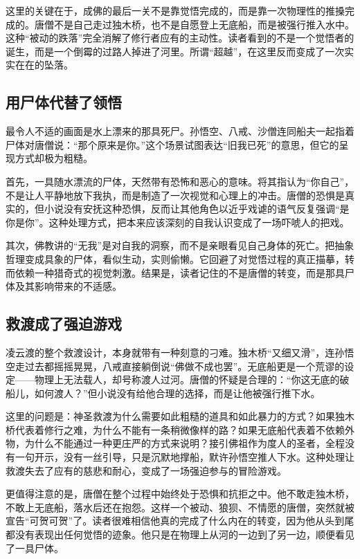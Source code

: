 \documentclass{ctexart}
\begin{document}
这里的关键在于，成佛的最后一关不是靠觉悟完成的，而是靠一次物理性的推搡完成的。唐僧不是自己走过独木桥，也不是自愿登上无底船，而是被强行推入水中。这种“被动的跌落”完全消解了修行者应有的主动性。读者看到的不是一个觉悟者的诞生，而是一个倒霉的过路人掉进了河里。所谓“超越”，在这里反而变成了一次实实在在的坠落。

\subsection{用尸体代替了领悟}

最令人不适的画面是水上漂来的那具死尸。孙悟空、八戒、沙僧连同船夫一起指着尸体对唐僧说：“那个原来是你。”这个场景试图表达“旧我已死”的意思，但它的呈现方式却极为粗糙。

首先，一具随水漂流的尸体，天然带有恐怖和恶心的意味。将其指认为“你自己”，不是让人平静地放下我执，而是制造了一次视觉和心理上的冲击。唐僧的恐惧是真实的，但小说没有安抚这种恐惧，反而让其他角色以近乎戏谑的语气反复强调“是你是你”。这种处理方式，把本来应该深刻的自我认识变成了一场吓唬人的把戏。

其次，佛教讲的“无我”是对自我的洞察，而不是亲眼看见自己身体的死亡。把抽象哲理变成具象的尸体，看似生动，实则偷懒。它回避了对觉悟过程的真正描摹，转而依赖一种猎奇式的视觉刺激。结果是，读者记住的不是唐僧的转变，而是那具尸体及其影响带来的不适感。

\subsection{救渡成了强迫游戏}

凌云渡的整个救渡设计，本身就带有一种刻意的刁难。独木桥“又细又滑”，连孙悟空走过去都摇摇晃晃，八戒直接躺倒说“佛做不成也罢”。无底船更是一个荒谬的设定——物理上无法载人，却号称渡人过河。唐僧的怀疑是合理的：“你这无底的破船儿，如何渡人？”但小说没有给他合理的选择，而是让他被强行推下水。

这里的问题是：神圣救渡为什么需要如此粗糙的道具和如此暴力的方式？如果独木桥代表着修行之难，为什么不能有一条稍微像样的路？如果无底船代表着不依赖外物，为什么不能通过一种更庄严的方式来说明？接引佛祖作为度人的圣者，全程没有一句开示，没有一丝引导，只是沉默地撑船，默许孙悟空推人下水。这种处理让救渡失去了应有的慈悲和耐心，变成了一场强迫参与的冒险游戏。

更值得注意的是，唐僧在整个过程中始终处于恐惧和抗拒之中。他不敢走独木桥，不敢上无底船，落水后还在抱怨。这样一个被动、狼狈、不情愿的唐僧，突然就被宣告“可贺可贺”了。读者很难相信他真的完成了什么内在的转变，因为他从头到尾都没有表现出任何觉悟的迹象。他只是在物理上从河的一边到了另一边，顺便看见了一具尸体。
\end{document}
